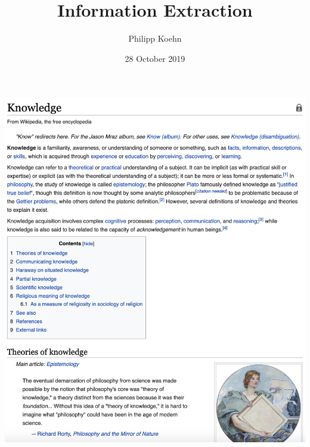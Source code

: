 \documentclass[landscape]{jhuslides3C}
\begin{document}
\rm
\title[Introduction to Human Language Technology: Information Extraction]{Information Extraction}
\author[Philipp Koehn]{Philipp Koehn}
\date{28 October 2019}
\maketitle


\vfill
\includegraphics[scale=0.35]{wikipedia-knowledge.png}
\end{document}
